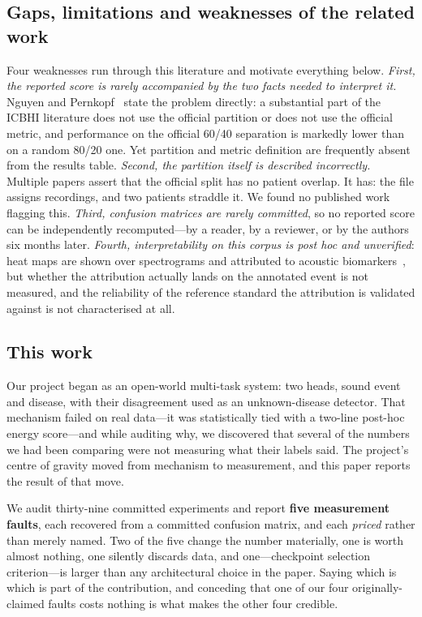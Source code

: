 \documentclass[journal,onecolumn]{IEEEtran}
\begin{document}
\subsection*{Gaps, limitations and weaknesses of the related work}

Four weaknesses run through this literature and motivate everything below.
\emph{First, the reported score is rarely accompanied by the two facts needed to
interpret it.} Nguyen and Pernkopf~\cite{nguyen2022cotuning} state the problem
directly: a substantial part of the ICBHI literature does not use the official
partition or does not use the official metric, and performance on the official
60/40 separation is markedly lower than on a random 80/20 one. Yet partition and
metric definition are frequently absent from the results table.
\emph{Second, the partition itself is described incorrectly.} Multiple papers
assert that the official split has no patient overlap. It has: the file assigns
recordings, and two patients straddle it. We found no published work flagging
this. \emph{Third, confusion matrices are rarely committed}, so no reported score
can be independently recomputed---by a reader, by a reviewer, or by the authors
six months later. \emph{Fourth, interpretability on this corpus is post hoc and
unverified}: heat maps are shown over spectrograms and attributed to acoustic
biomarkers~\cite{scirep2025cnnrnn}, but whether the attribution actually lands on
the annotated event is not measured, and the reliability of the reference standard
the attribution is validated against is not characterised at all.

\subsection*{This work}

Our project began as an open-world multi-task system: two heads, sound event and
disease, with their disagreement used as an unknown-disease detector. That
mechanism failed on real data---it was statistically tied with a two-line
post-hoc energy score---and while auditing why, we discovered that several of the
numbers we had been comparing were not measuring what their labels said. The
project's centre of gravity moved from mechanism to measurement, and this paper
reports the result of that move.

We audit thirty-nine committed experiments and report \textbf{five measurement
faults}, each recovered from a committed confusion matrix, and each \emph{priced}
rather than merely named. Two of the five change the number materially, one is
worth almost nothing, one silently discards data, and one---checkpoint selection
criterion---is larger than any architectural choice in the paper. Saying which is
which is part of the contribution, and conceding that one of our four
originally-claimed faults costs nothing is what makes the other four credible.
\end{document}
